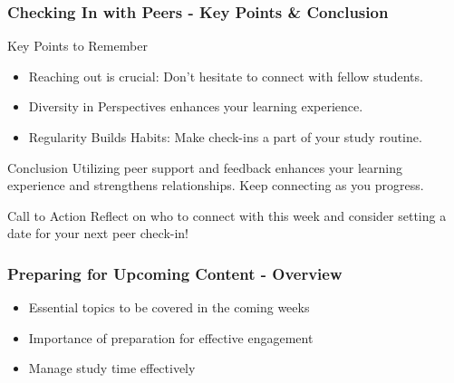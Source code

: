 \documentclass[aspectratio=169]{beamer}
\begin{document}
\begin{frame}[fragile]
    \frametitle{Checking In with Peers - Key Points & Conclusion}
    \begin{block}{Key Points to Remember}
        \begin{itemize}
            \item Reaching out is crucial: Don’t hesitate to connect with fellow students.
            \item Diversity in Perspectives enhances your learning experience.
            \item Regularity Builds Habits: Make check-ins a part of your study routine.
        \end{itemize}
    \end{block}
    
    \begin{block}{Conclusion}
        Utilizing peer support and feedback enhances your learning experience and strengthens relationships. Keep connecting as you progress.
    \end{block}

    \begin{block}{Call to Action}
        Reflect on who to connect with this week and consider setting a date for your next peer check-in!
    \end{block}
\end{frame}

\begin{frame}[fragile]
    \frametitle{Preparing for Upcoming Content - Overview}
    \begin{itemize}
        \item Essential topics to be covered in the coming weeks
        \item Importance of preparation for effective engagement
        \item Manage study time effectively
    \end{itemize}
\end{frame}
\end{document}
